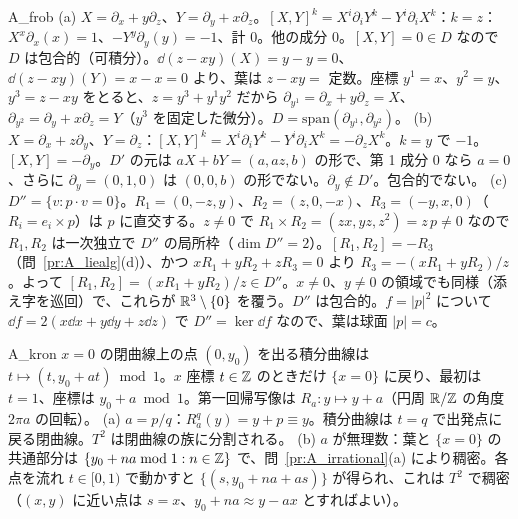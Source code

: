 \begin{soll}{A_frob}
(a) $X=\partial_x+y\partial_z$、$Y=\partial_y+x\partial_z$。$[X,Y]^k=X^i\partial_iY^k-Y^i\partial_iX^k$：$k=z$：$X^x\partial_x(x)=1$、$-Y^y\partial_y(y)=-1$、計 $0$。他の成分 $0$。$[X,Y]=0\in D$ なので $D$ は包合的（可積分）。$\dd(z-xy)(X)=y-y=0$、$\dd(z-xy)(Y)=x-x=0$ より、葉は $z-xy=$ 定数。座標 $y^1=x$、$y^2=y$、$y^3=z-xy$ をとると、$z=y^3+y^1y^2$ だから $\partial_{y^1}=\partial_x+y\partial_z=X$、$\partial_{y^2}=\partial_y+x\partial_z=Y$（$y^3$ を固定した微分）。$D=\mathrm{span}(\partial_{y^1},\partial_{y^2})$。
(b) $X=\partial_x+z\partial_y$、$Y=\partial_z$：$[X,Y]^k=X^i\partial_iY^k-Y^i\partial_iX^k=-\partial_zX^k$。$k=y$ で $-1$。$[X,Y]=-\partial_y$。$D'$ の元は $aX+bY=(a,az,b)$ の形で、第 1 成分 $0$ なら $a=0$、さらに $\partial_y=(0,1,0)$ は $(0,0,b)$ の形でない。$\partial_y\notin D'$。包合的でない。
(c) $D''=\{v:p\cdot v=0\}$。$R_1=(0,-z,y)$、$R_2=(z,0,-x)$、$R_3=(-y,x,0)$（$R_i=e_i\times p$）は $p$ に直交する。$z\ne0$ で $R_1\times R_2=(zx,yz,z^2)=z\,p\ne0$ なので $R_1,R_2$ は一次独立で $D''$ の局所枠（$\dim D''=2$）。$[R_1,R_2]=-R_3$（問~\ref{pr:A_liealg}(d)）、かつ $xR_1+yR_2+zR_3=0$ より $R_3=-(xR_1+yR_2)/z$。よって $[R_1,R_2]=(xR_1+yR_2)/z\in D''$。$x\ne0$、$y\ne0$ の領域でも同様（添え字を巡回）で、これらが $\mathbb R^3\setminus\{0\}$ を覆う。$D''$ は包合的。$f=|p|^2$ について $\dd f=2(x\dd x+y\dd y+z\dd z)$ で $D''=\ker\dd f$ なので、葉は球面 $|p|=c$。
\end{soll}

\begin{soll}{A_kron}
$x=0$ の閉曲線上の点 $(0,y_0)$ を出る積分曲線は $t\mapsto(t,y_0+at)\bmod1$。$x$ 座標 $t\in\mathbb Z$ のときだけ $\{x=0\}$ に戻り、最初は $t=1$、座標は $y_0+a\bmod1$。第一回帰写像は $R_a:y\mapsto y+a$（円周 $\mathbb R/\mathbb Z$ の角度 $2\pi a$ の回転）。
(a) $a=p/q$：$R_a^q(y)=y+p\equiv y$。積分曲線は $t=q$ で出発点に戻る閉曲線。$T^2$ は閉曲線の族に分割される。
(b) $a$ が無理数：葉と $\{x=0\}$ の共通部分は $\{y_0+na\bmod1:n\in\mathbb Z\}$ で、問~\ref{pr:A_irrational}(a) により稠密。各点を流れ $t\in[0,1)$ で動かすと $\{(s,y_0+na+as)\}$ が得られ、これは $T^2$ で稠密（$(x,y)$ に近い点は $s=x$、$y_0+na\approx y-ax$ とすればよい）。
\end{soll}

